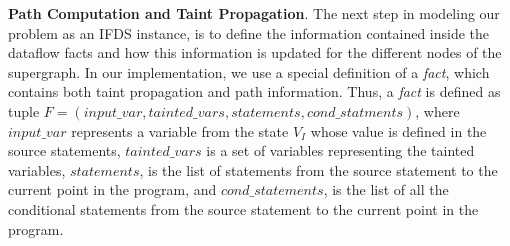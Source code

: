 \noindent
\textbf{Path Computation and Taint Propagation}.
The next step in modeling our problem as an IFDS instance, is to define the information contained inside the dataflow facts and how this information is updated for the different nodes of the supergraph. In our implementation, we use a special definition of a \emph{fact}, which contains both taint propagation and path information. Thus, a \emph{fact} is defined as tuple $F = (input\_var, tainted\_vars, statements, cond\_statments)$, where $input\_var$ represents a variable from the state $V_I$ whose value is defined in the source statements, $tainted\_vars$ is a set of variables representing the tainted variables, $statements$, is the list of statements from the source statement to the current point in the program, and $cond\_statements$, is the list of all the conditional statements from the source statement to the current point in the program. 


